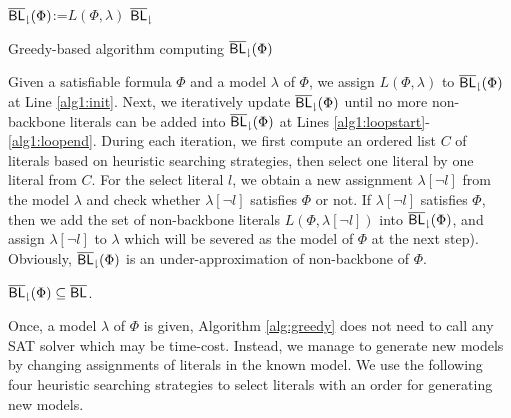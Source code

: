 \begin{algorithm}
\SetAlgoShortEnd
\SetFillComment
{}
${\sf \overline{BL}_\downharpoonright}(\Phi)$:=$L(\Phi,\lambda)$\; \label{alg1:init}
\label{alg1:loopend}
\Return ${\sf \overline{BL}_\downharpoonright}$\;
\caption{Greedy-based algorithm computing ${\sf \overline{BL}_\downharpoonright}(\Phi)$}
\label{alg:greedy}
\end{algorithm}
Given a satisfiable formula $\Phi$ and a model $\lambda$ of $\Phi$,
we assign $L(\Phi,\lambda)$ to ${\sf \overline{BL}_\downharpoonright}(\Phi)$ at Line \ref{alg1:init}. Next, we iteratively update
${\sf \overline{BL}_\downharpoonright}(\Phi)$ until no more non-backbone literals can be added into ${\sf \overline{BL}_\downharpoonright}(\Phi)$ at Lines \ref{alg1:loopstart}-\ref{alg1:loopend}.
During each iteration, we first compute an ordered list $C$ of literals based on heuristic searching strategies, then select one literal  by one literal from
$C$. For the select literal $l$, we obtain a new assignment $\lambda[\neg l]$ from the model
$\lambda$ and check whether  $\lambda[\neg l]$ satisfies $\Phi$ or not.
If $\lambda[\neg l]$ satisfies $\Phi$, then we add the set of non-backbone literals $L(\Phi,\lambda[\neg l])$ into ${\sf \overline{BL}_\downharpoonright}(\Phi)$, and
assign $\lambda[\neg l]$ to $\lambda$ which will be severed as the model of $\Phi$ at the next step).
Obviously,  ${\sf \overline{BL}_\downharpoonright}(\Phi)$ is an under-approximation of non-backbone of $\Phi$.

\begin{lemma}
${\sf \overline{BL}_\downharpoonright}(\Phi)\subseteq\overline{\textsf{BL}}$.
\end{lemma}

Once, a model $\lambda$ of $\Phi$ is given, Algorithm \ref{alg:greedy} does not need to call any SAT solver which may be time-cost.
Instead, we manage to generate new models by changing assignments of literals in the known model.
We use the following four heuristic searching strategies to select literals with an order for generating new models.

